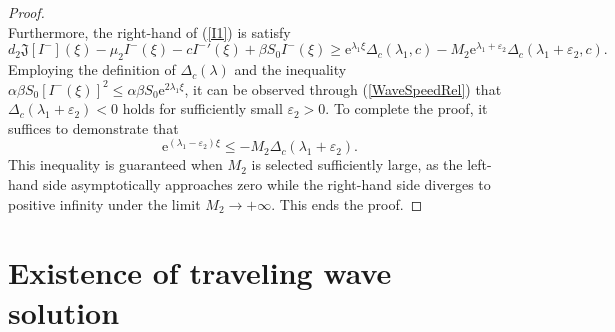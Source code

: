 \documentclass[final,3p,times]{elsarticle}
\numberwithin{equation}{section}
\begin{document}
\begin{proof}
\[\]
Furthermore, the right-hand of (\ref{I1}) is satisfy
\[
d_2\mathfrak{J}[ I^-](\xi) - \mu_2  I^-(\xi) - c{ I^-}'(\xi) + \beta S_0  I^-(\xi) \geq \mathrm{e}^{\lambda_1\xi}\Delta_c(\lambda_1,c) - M_2 \mathrm{e}^{\lambda_1+\varepsilon_2}\Delta_c(\lambda_1+\varepsilon_2,c).
\]
Employing the definition of $\Delta_c(\lambda)$ and the inequality $\alpha\beta S_0[ I^-(\xi)]^2\leq \alpha\beta S_0 \mathrm{e}^{2\lambda_1\xi}$, it can be observed through (\ref{WaveSpeedRel}) that $\Delta_c(\lambda_1+\varepsilon_2)<0$ holds for sufficiently small $\varepsilon_2>0$. To complete the proof, it suffices to demonstrate that
\[
\mathrm{e}^{(\lambda_1 - \varepsilon_2)\xi} \leq - M_2 \Delta_c(\lambda_1+\varepsilon_2).
\]
This inequality is guaranteed when $M_2$ is selected sufficiently large, as the left-hand side asymptotically approaches zero while the right-hand side diverges to positive infinity under the limit $M_2\rightarrow+\infty$. This ends the proof.
\end{proof}

\section{Existence of traveling wave solution}
\end{document}
